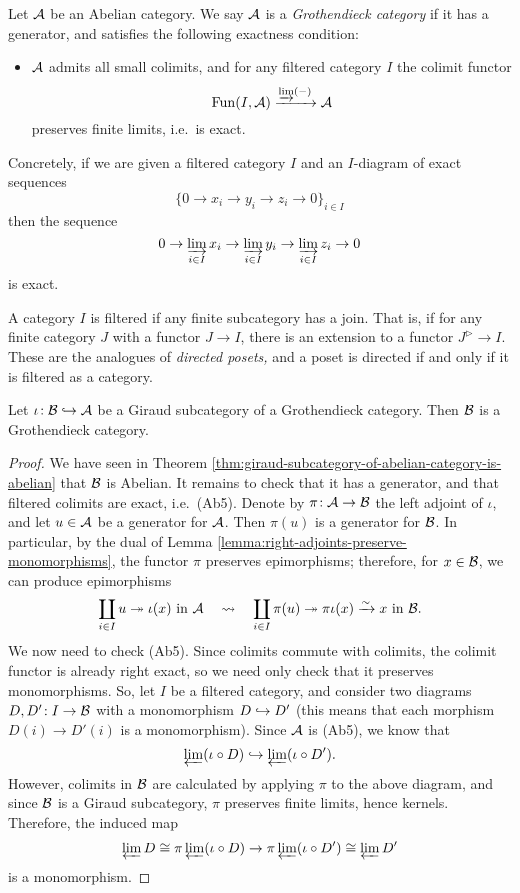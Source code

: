 \begin{definition}
	Let \(\calA\) be an Abelian category. We say \(\calA\) is a \emph{Grothendieck category} if it has a generator, and satisfies the following exactness condition:
	\begin{itemize}[label=(Ab5)]
	\item \(\calA\) admits all small colimits, and for any filtered category \(I\) the colimit functor
	\[ \Fun(I,\calA)\xrightarrow{\injlim(-)}\calA \]
	preserves finite limits, i.e.\ is exact.
	\end{itemize}
\end{definition}
\begin{remark}
	Concretely, if we are given a filtered category \(I\) and an \(I\)-diagram of exact sequences
	\[ \{ 0 \to x_i \to y_i \to z_i \to 0 \}_{i\in I} \]
	then the sequence
	\[ 0 \to \injlim_{i\in I}x_i \to \injlim_{i\in I}y_i \to \injlim_{i\in I}z_i \to 0 \]
	is exact.
\end{remark}
\begin{remark}
	A category \(I\) is filtered if any finite subcategory has a join. That is, if for any finite category \(J\) with a functor \(J\to I\), there is an extension
	to a functor \(J^\triangleright \to I\). These are the analogues of \emph{directed posets,} and a poset is directed if and only if it is filtered as a category.
\end{remark}

\begin{proposition}
	Let \(\iota\!:\calB\inj\calA\) be a Giraud subcategory of a Grothendieck category. Then \(\calB\) is a Grothendieck category.
\end{proposition}
\begin{proof}
We have seen in Theorem \ref{thm:giraud-subcategory-of-abelian-category-is-abelian} that \(\calB\) is Abelian. It remains to check that it has a generator, and that
filtered colimits are exact, i.e.\ (Ab5). Denote by \(\pi\!:\calA\to\calB\) the left adjoint of \(\iota\), and let \(u\in\calA\) be a generator for \(\calA\). Then
\(\pi(u)\) is a generator for \(\calB\). In particular, by the dual of Lemma \ref{lemma:right-adjoints-preserve-monomorphisms}, the functor \(\pi\) preserves epimorphisms;
therefore, for \(x\in\calB\), we can produce epimorphisms
\[ \coprod_{i\in I}u \sur \iota(x) \text{ in }\calA\quad\leadsto\quad \coprod_{i\in I}\pi(u) \sur \pi\iota(x) \iso x\text{ in }\calB. \]
We now need to check (Ab5). Since colimits commute with colimits, the colimit functor is already right exact, so we need only check that it preserves monomorphisms.
So, let \(I\) be a filtered category, and consider two diagrams \(D,D'\!:I\to\calB\) with a monomorphism \(D\inj D'\) (this means that each morphism \(D(i)\to D'(i)\) is a monomorphism).
Since \(\calA\) is (Ab5), we know that
\[ \projlim(\iota\circ D) \inj \projlim(\iota\circ D'). \]
However, colimits in \(\calB\) are calculated by applying \(\pi\) to the above diagram, and since \(\calB\) is a Giraud subcategory, \(\pi\) preserves finite limits, hence kernels.
Therefore, the induced map
\[ \projlim{D} \cong \pi\projlim(\iota\circ D) \to \pi\projlim(\iota\circ D') \cong \projlim{D'} \]
is a monomorphism.
\end{proof}

